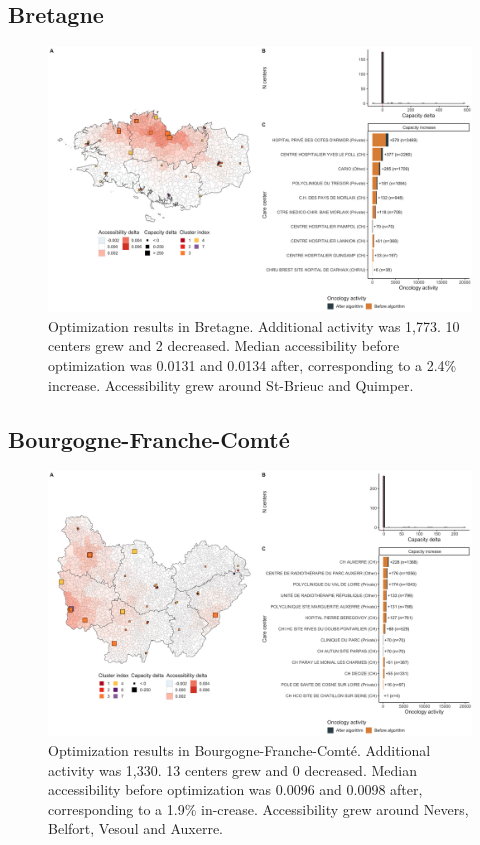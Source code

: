 \subsection*{Bretagne}

\begin{figure}[h]
    \includegraphics[width=\textwidth]{images/camion/optim_region/optim_Bretagne.png}
    \centering
    \caption{
        Optimization results in Bretagne. Additional activity was 1,773. 10 centers grew and 2 decreased. Median accessibility before optimization was 0.0131 and 0.0134 after, corresponding to a 2.4\% increase. Accessibility grew around St-Brieuc and Quimper.
    }
\end{figure}

\subsection*{Bourgogne-Franche-Comté}

\begin{figure}[h]
    \includegraphics[width=\textwidth]{images/camion/optim_region/optim_Bourgogne-Franche-Comte.png}
    \centering
    \caption{
        Optimization results in Bourgogne-Franche-Comté. Additional activity was 1,330. 13 centers grew and 0 decreased. Median accessibility before optimization was 0.0096 and 0.0098 after, corresponding to a 1.9\% in-crease. Accessibility grew around Nevers, Belfort, Vesoul and Auxerre.
    }
\end{figure}

